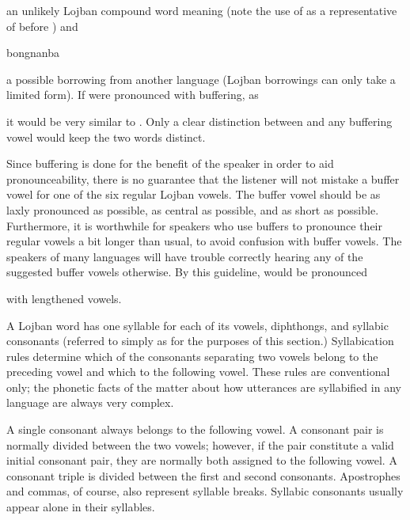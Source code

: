 {\noindent}an unlikely Lojban compound word meaning  (note the use of  as a representative of  before ) and
\begin{example}
bongnanba\n
{}
\end{example}

{\noindent}a possible borrowing from another language (Lojban borrowings can only take a limited form). If  were pronounced with buffering, as
\begin{example}
\end{example}

{\noindent}it would be very similar to . Only a clear distinction between  and any buffering vowel would keep the two words distinct. 

Since buffering is done for the benefit of the speaker in order to aid pronounceability, there is no guarantee that the listener will not mistake a buffer vowel for one of the six regular Lojban vowels. The buffer vowel should be as laxly pronounced as possible, as central as possible, and as short as possible. Furthermore, it is worthwhile for speakers who use buffers to pronounce their regular vowels a bit longer than usual, to avoid confusion with buffer vowels. The speakers of many languages will have trouble correctly hearing any of the suggested buffer vowels otherwise. By this guideline,  would be pronounced
\begin{example}
\end{example}

{\noindent}with lengthened vowels.



A Lojban word has one syllable for each of its vowels, diphthongs, and syllabic consonants (referred to simply as  for the purposes of this section.) Syllabication rules determine which of the consonants separating two vowels belong to the preceding vowel and which to the following vowel. These rules are conventional only; the phonetic facts of the matter about how utterances are syllabified in any language are always very complex.

A single consonant always belongs to the following vowel. A consonant pair is normally divided between the two vowels; however, if the pair constitute a valid initial consonant pair, they are normally both assigned to the following vowel. A consonant triple is divided between the first and second consonants. Apostrophes and commas, of course, also represent syllable breaks. Syllabic consonants usually appear alone in their syllables.

